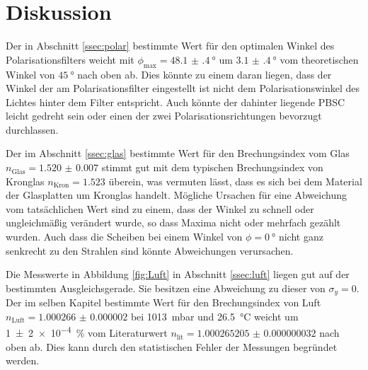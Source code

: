 
\section{Diskussion}
\label{sec:Diskussion}
Der in Abschnitt \ref{ssec:polar} bestimmte Wert für den optimalen Winkel des Polarisationsfilters weicht mit $\phi_\text{max}=\SI{48.1(4)}{\degree}$ um $\SI{3.1(4)}{\degree}$ vom theoretischen Winkel von $\SI{45}{\degree}$ nach oben ab. Dies könnte zu einem daran liegen, dass der Winkel der am Polarisationsfilter eingestellt ist nicht dem Polarisationswinkel des Lichtes hinter dem Filter entspricht. Auch könnte der dahinter liegende PBSC leicht gedreht sein oder einen der zwei Polarisationsrichtungen bevorzugt durchlassen.

Der im Abschnitt \ref{ssec:glas} bestimmte Wert für den Brechungsindex vom Glas $n_\text{Glas}=\num{1.520(7)}$ stimmt gut mit dem typischen Brechungsindex von Kronglas $n_\text{Kron}=\num{1.523}$ \cite{nKron} überein, was vermuten lässt, dass es sich bei dem Material der Glasplatten um Kronglas handelt. Mögliche Ursachen für eine Abweichung vom tatsächlichen Wert sind zu einem, dass der Winkel zu schnell oder ungleichmäßig verändert wurde, so dass Maxima nicht oder mehrfach gezählt wurden. Auch dass die Scheiben bei einem Winkel von $\phi=\SI{0}{\degree}$ nicht ganz senkrecht zu den Strahlen sind könnte Abweichungen verursachen.

Die Messwerte in Abbildung \ref{fig:Luft} in Abschnitt \ref{ssec:luft} liegen gut auf der bestimmten Ausgleichsgerade. Sie besitzen eine Abweichung zu dieser von $\sigma_y=\num{0}$. Der im selben Kapitel bestimmte Wert für den Brechungsindex von Luft $n_\text{Luft}=\num{1.000266(2)}$ bei \SI{1013}{\milli\bar} und \SI{26.5}{\degreeCelsius} weicht um \SI{1(2)e-4}{\percent} vom Literaturwert $n_\text{lit}=\num{1.000265205(32)}$ \cite{nist} nach oben ab. Dies kann durch den statistischen Fehler der Messungen begründet werden.



